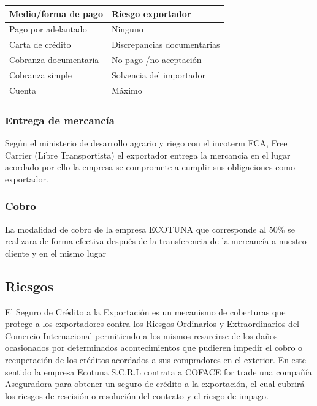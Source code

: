 \documentclass[
  stu,
  floatsintext,
  longtable,
  a4paper,
  nolmodern,
  notxfonts,
  notimes,
  colorlinks=true,linkcolor=blue,citecolor=blue,urlcolor=blue]{apa7}
\begin{document}
\begin{longtable}[]{@{}ll@{}}
\toprule\noalign{}
\textbf{Medio/forma de pago} & \textbf{Riesgo exportador} \\
\midrule\noalign{}
\endhead
\bottomrule\noalign{}
\endlastfoot
Pago por adelantado & Ninguno \\
Carta de crédito & Discrepancias documentarias \\
Cobranza documentaria & No pago /no aceptación \\
Cobranza simple & Solvencia del importador \\
Cuenta & Máximo \\
\end{longtable}

\subsubsection{Entrega de mercancía}\label{entrega-de-mercancuxeda}

Según el ministerio de desarrollo agrario y riego con el incoterm FCA,
Free Carrier (Libre Transportista) el exportador entrega la mercancía en
el lugar acordado por ello la empresa se compromete a cumplir sus
obligaciones como exportador.

\subsubsection{Cobro}\label{cobro}

La modalidad de cobro de la empresa ECOTUNA que corresponde al 50\% se
realizara de forma efectiva después de la transferencia de la mercancía
a nuestro cliente y en el mismo lugar

\subsection{Riesgos}\label{riesgos}

El Seguro de Crédito a la Exportación es un mecanismo de coberturas que
protege a los exportadores contra los Riesgos Ordinarios y
Extraordinarios del Comercio Internacional permitiendo a los mismos
resarcirse de los daños ocasionados por determinados acontecimientos que
pudieren impedir el cobro o recuperación de los créditos acordados a sus
compradores en el exterior. En este sentido la empresa Ecotuna S.C.R.L
contrata a COFACE for trade una compañía Aseguradora para obtener un
seguro de crédito a la exportación, el cual cubrirá los riesgos de
rescisión o resolución del contrato y el riesgo de impago.
\end{document}
